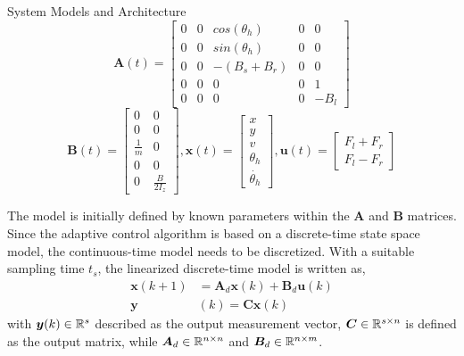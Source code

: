 \begin{section}{System Models and Architecture}
    \begin{equation}
	\bm{A}(t)=\begin{bmatrix} 0 & 0 & cos(\theta_h) & 0 & 0\\ 0 & 0 & sin(\theta_h) & 0 & 0 \\ 0 & 0 & -(B_s+B_r) & 0 & 0 \\ 0 & 0 & 0 & 0 & 1 \\ 0 & 0 & 0 & 0 & -B_l \end{bmatrix} \nonumber
	\end{equation}
	\begin{equation}
	\bm{B}(t)=\begin{bmatrix} 0 & 0 \\ 0 & 0 \\ \frac{1}{m} & 0 \\ 0 & 0 \\ 0 & \frac{B}{2I_z} \end{bmatrix}, 
     \bm{x}(t)=\begin{bmatrix} x \\ y \\ v \\ \theta_h \\ \dot{\theta_h} \end{bmatrix}, \bm{u}(t)= \begin{bmatrix} F_l+F_r \\ F_l-F_r  \end{bmatrix}  \nonumber
	\end{equation}

The model is initially defined by known parameters within the $\bm{A}$ and $\bm{B}$ matrices. Since the adaptive control algorithm is based on a discrete-time state space model, the continuous-time model needs to be discretized. With a suitable sampling time $t_s$, the linearized discrete-time model is written as,
    \begin{equation}
    \begin{split}
    \label{eq:discritzed_SS_model}
	\bm{x}(k+1) &= \bm{A}_d\bm{x}(k) + \bm{B}_d\bm{u}(k) \\
	\bm{y}&(k)=\bm{C}\bm{x}(k)
	\end{split}
	\end{equation}
with $\bm{y}(k) \in \mathbb{R}^{s}$ described as the output measurement vector, $\bm{C} \in \mathbb{R}^{s\times n}$ is defined as the output matrix, while $\bm{A}_d \in \mathbb{R}^{n\times n}$ and $\bm{B}_d \in \mathbb{R}^{n\times m}$.


\end{section}
